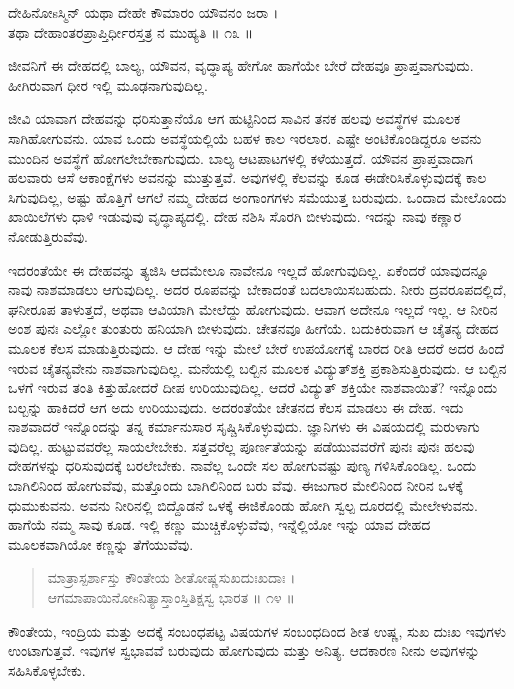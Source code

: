 ದೇಹಿನೋsಸ್ಮಿನ್ ಯಥಾ ದೇಹೇ ಕೌಮಾರಂ ಯೌವನಂ ಜರಾ ।\\ತಥಾ ದೇಹಾಂತರಪ್ರಾಪ್ತಿರ್ಧೀರಸ್ತತ್ರ ನ ಮುಹ್ಯತಿ \num{॥ ೧೩ ॥}

{\small ಜೀವನಿಗೆ ಈ ದೇಹದಲ್ಲಿ ಬಾಲ್ಯ, ಯೌವನ, ವೃದ್ಧಾಪ್ಯ ಹೇಗೋ ಹಾಗೆಯೇ ಬೇರೆ ದೇಹವೂ ಪ್ರಾಪ್ತವಾಗುವುದು. ಹೀಗಿರುವಾಗ ಧೀರ ಇಲ್ಲಿ ಮೂಢನಾಗುವುದಿಲ್ಲ.}

ಜೀವಿ ಯಾವಾಗ ದೇಹವನ್ನು ಧರಿಸುತ್ತಾನೆಯೊ ಆಗ ಹುಟ್ಟಿನಿಂದ ಸಾವಿನ ತನಕ ಹಲವು ಅವಸ್ಥೆಗಳ ಮೂಲಕ ಸಾಗಿಹೋಗುವನು. ಯಾವ ಒಂದು ಅವಸ್ಥೆಯಲ್ಲಿಯೆ ಬಹಳ ಕಾಲ ಇರಲಾರ. ಎಷ್ಟೇ ಅಂಟಿಕೊಂಡಿದ್ದರೂ ಅವನು ಮುಂದಿನ ಅವಸ್ಥೆಗೆ ಹೋಗಲೇಬೇಕಾಗುವುದು. ಬಾಲ್ಯ ಆಟಪಾಟಗಳಲ್ಲಿ ಕಳೆಯುತ್ತದೆ. ಯೌವನ ಪ್ರಾಪ್ತವಾದಾಗ ಹಲವಾರು ಆಸೆ ಆಕಾಂಕ್ಷೆಗಳು ಅವನನ್ನು ಮುತ್ತುತ್ತವೆ. ಅವುಗಳಲ್ಲಿ ಕೆಲವನ್ನು ಕೂಡ ಈಡೇರಿಸಿಕೊಳ್ಳುವುದಕ್ಕೆ ಕಾಲ ಸಿಗುವುದಿಲ್ಲ, ಅಷ್ಟು ಹೊತ್ತಿಗೆ ಆಗಲೆ ನಮ್ಮ ದೇಹದ ಅಂಗಾಂಗಗಳು ಸಮೆಯುತ್ತ ಬರುವುದು. ಒಂದಾದ ಮೇಲೊಂದು ಖಾಯಿಲೆಗಳು ಧಾಳಿ ಇಡುವುವು ವೃದ್ಧಾಪ್ಯದಲ್ಲಿ. ದೇಹ ನಶಿಸಿ ಸೊರಗಿ ಬೀಳುವುದು. ಇದನ್ನು ನಾವು ಕಣ್ಣಾರ ನೋಡುತ್ತಿರುವೆವು.

ಇದರಂತೆಯೇ ಈ ದೇಹವನ್ನು ತ್ಯಜಿಸಿ ಆದಮೇಲೂ ನಾವೇನೂ ಇಲ್ಲದೆ ಹೋಗುವುದಿಲ್ಲ. ಏಕೆಂದರೆ ಯಾವುದನ್ನೂ ನಾವು ನಾಶಮಾಡಲು ಆಗುವುದಿಲ್ಲ. ಅದರ ರೂಪವನ್ನು ಬೇಕಾದಂತೆ ಬದಲಾಯಿಸಬಹುದು. ನೀರು ದ್ರವರೂಪದಲ್ಲಿದೆ, ಘನೀರೂಪ ತಾಳುತ್ತದೆ, ಅಥವಾ ಆವಿಯಾಗಿ ಮೇಲೆದ್ದು ಹೋಗುವುದು. ಆವಾಗ ಅದೇನೂ ಇಲ್ಲದೆ ಇಲ್ಲ. ಆ ನೀರಿನ ಅಂಶ ಪುನಃ ಎಲ್ಲೋ ತುಂತುರು ಹನಿಯಾಗಿ ಬೀಳುವುದು. ಚೇತನವೂ ಹೀಗೆಯೆ. ಬದುಕಿರುವಾಗ ಆ ಚೈತನ್ಯ ದೇಹದ ಮೂಲಕ ಕೆಲಸ ಮಾಡುತ್ತಿರುವುದು. ಆ ದೇಹ ಇನ್ನು ಮೇಲೆ ಬೇರೆ ಉಪಯೋಗಕ್ಕೆ ಬಾರದ ರೀತಿ ಆದರೆ ಅದರ ಹಿಂದೆ ಇರುವ ಚೈತನ್ಯವೇನು ನಾಶವಾಗುವುದಿಲ್ಲ. ಮನೆಯಲ್ಲಿ ಬಲ್ಬಿನ ಮೂಲಕ ವಿದ್ಯುತ್​ಶಕ್ತಿ ಪ್ರಕಾಶಿಸುತ್ತಿರುವುದು. ಆ ಬಲ್ಬಿನ ಒಳಗೆ ಇರುವ ತಂತಿ ಕಿತ್ತುಹೋದರೆ ದೀಪ ಉರಿಯುವುದಿಲ್ಲ. ಆದರೆ ವಿದ್ಯುತ್ ಶಕ್ತಿಯೇ ನಾಶವಾಯಿತೆ? ಇನ್ನೊಂದು ಬಲ್ಬನ್ನು ಹಾಕಿದರೆ ಆಗ ಅದು ಉರಿಯುವುದು. ಅದರಂತೆಯೇ ಚೇತನದ ಕೆಲಸ ಮಾಡಲು ಈ ದೇಹ. ಇದು ನಾಶವಾದರೆ ಇನ್ನೊಂದನ್ನು ತನ್ನ ಕರ್ಮಾನುಸಾರ ಸೃಷ್ಚಿಸಿಕೊಳ್ಳುವುದು. ಜ್ಞಾನಿಗಳು ಈ ವಿಷಯದಲ್ಲಿ ಮರುಳಾಗು ವುದಿಲ್ಲ. ಹುಟ್ಟುವವರೆಲ್ಲ ಸಾಯಲೇಬೇಕು. ಸತ್ತವರೆಲ್ಲ ಪೂರ್ಣತೆಯನ್ನು ಪಡೆಯುವವರೆಗೆ ಪುನಃ ಪುನಃ ಹಲವು ದೇಹಗಳನ್ನು ಧರಿಸುವುದಕ್ಕೆ ಬರಲೇಬೇಕು. ನಾವೆಲ್ಲ ಒಂದೇ ಸಲ ಹೋಗುವಷ್ಟು ಪುಣ್ಯ ಗಳಿಸಿಕೊಂಡಿಲ್ಲ. ಒಂದು ಬಾಗಿಲಿನಿಂದ ಹೋಗುವೆವು, ಮತ್ತೊಂದು ಬಾಗಿಲಿನಿಂದ ಬರು ವೆವು. ಈಜುಗಾರ ಮೇಲಿನಿಂದ ನೀರಿನ ಒಳಕ್ಕೆ ಧುಮುಕುವನು. ಅವನು ನೀರಿನಲ್ಲಿ ಬಿದ್ದೊಡನೆ ಒಳಕ್ಕೆ ಈಜಿಕೊಂಡು ಹೋಗಿ ಸ್ವಲ್ಪ ದೂರದಲ್ಲಿ ಮೇಲೇಳುವನು. ಹಾಗೆಯೆ ನಮ್ಮ ಸಾವು ಕೂಡ. ಇಲ್ಲಿ ಕಣ್ಣು ಮುಚ್ಚಿಕೊಳ್ಳುವೆವು, ಇನ್ನೆಲ್ಲಿಯೋ ಇನ್ನು ಯಾವ ದೇಹದ ಮೂಲಕವಾಗಿಯೋ ಕಣ್ಣನ್ನು ತೆಗೆಯುವೆವು.

\begin{verse}
ಮಾತ್ರಾಸ್ಪರ್ಶಾಸ್ತು ಕೌಂತೇಯ ಶೀತೋಷ್ಣಸುಖದುಃಖದಾಃ ।\\ಆಗಮಾಪಾಯಿನೋsನಿತ್ಯಾಸ್ತಾಂಸ್ತಿತಿಕ್ಷಸ್ವ ಭಾರತ \num{॥ ೧೪ ॥}
\end{verse}

{\small ಕೌಂತೇಯ, ಇಂದ್ರಿಯ ಮತ್ತು ಅದಕ್ಕೆ ಸಂಬಂಧಪಟ್ಟ ವಿಷಯಗಳ ಸಂಬಂಧದಿಂದ ಶೀತ ಉಷ್ಣ, ಸುಖ ದುಃಖ ಇವುಗಳು ಉಂಟಾಗುತ್ತವೆ. ಇವುಗಳ ಸ್ವಭಾವವೆ ಬರುವುದು ಹೋಗುವುದು ಮತ್ತು ಅನಿತ್ಯ. ಆದಕಾರಣ ನೀನು ಅವುಗಳನ್ನು ಸಹಿಸಿಕೊಳ್ಳಬೇಕು.}

